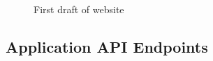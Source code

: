 \documentclass[12pt]{article} %
\begin{document}
	\begin{figure}[H] %
	\caption{First draft of website}
	\label{firstDraft}
	\end{figure}

\subsection{Application API Endpoints}
\end{document}
